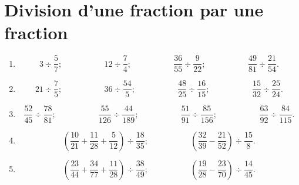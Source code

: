 
 \chapter{Division d'une fraction par une fraction}
 
 \begin{enumerate}
 \item \[ 3 \div \frac57;\phantom{meowmeow}
 12\div \frac74 ; \phantom{meowmeow}
 \frac{36}{55}\div\frac{9}{22}; \phantom{meowmeow}
 \frac{49}{81}\div \frac{21}{54}.\]
 
  \item \[ 21 \div \frac75;\phantom{meowmeow}
 36\div \frac{54}5 ; \phantom{meowmeow}
 \frac{48}{25}\div\frac{16}{15}; \phantom{meowmeow}
 \frac{15}{32}\div \frac{25}{24}.\]
 
  \item \[ \frac{52}{45} \div \frac{78}{81};\phantom{meowmeow}
 \frac{55}{126}\div\frac{44}{189} ; \phantom{meowmeow}
 \frac{51}{91}\div\frac{85}{156}; \phantom{meowmeow}
 \frac{63}{92}\div \frac{84}{115}.\]
 
 \item \[ \left( \frac{10}{21} +\frac{11}{28} + \frac5{12} \right) \div \frac{18}{35} ;
 \phantom{meowmeow}
 \left( \frac{32}{39} - \frac{21}{52} \right) \div \frac{15}{8}. \]
 
 \item \[ \left( \frac{23}{44} +\frac{34}{77} + \frac{11}{28} \right) \div \frac{38}{49};
 \phantom{meowmeow}
 \left( \frac{19}{28} - \frac{23}{70} \right) \div \frac{14}{45}. \]
 

\end{enumerate}
